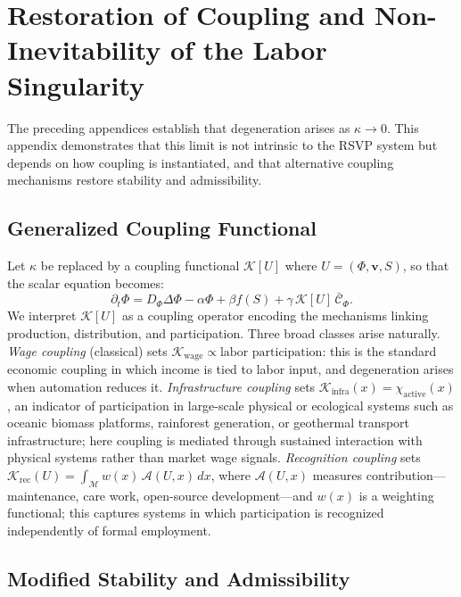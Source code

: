 \documentclass[11pt, a4paper]{article}
\theoremstyle{plain}
\theoremstyle{definition}
\newcommand{\Phifield}{\Phi}
\newcommand{\vfield}{\mathbf{v}}
\newcommand{\Sfield}{S}
\newcommand{\statespace}{\mathcal{M}}
\newcommand{\coupling}{\kappa}
\begin{document}
\section{Restoration of Coupling and Non-Inevitability of the Labor Singularity}

The preceding appendices establish that degeneration arises as $\coupling \to 0$.
This appendix demonstrates that this limit is not intrinsic to the RSVP system
but depends on how coupling is instantiated, and that alternative coupling
mechanisms restore stability and admissibility.

\subsection{Generalized Coupling Functional}

Let $\coupling$ be replaced by a coupling functional $\mathcal{K}[U]$ where
$U = (\Phifield, \vfield, \Sfield)$, so that the scalar equation becomes:
\[
  \partial_t \Phifield
  =
  D_\Phi \Delta \Phifield
  - \alpha \Phifield
  + \beta f(\Sfield)
  + \gamma\, \mathcal{K}[U]\, \bar{\mathcal{C}}_\Phi.
\]
We interpret $\mathcal{K}[U]$ as a coupling operator encoding the mechanisms
linking production, distribution, and participation. Three broad classes arise
naturally. \emph{Wage coupling} (classical) sets $\mathcal{K}_{\mathrm{wage}} \propto \text{labor participation}$: this is the standard economic coupling in which income is tied to labor input, and degeneration arises when automation reduces it. \emph{Infrastructure coupling} sets $\mathcal{K}_{\mathrm{infra}}(x) = \chi_{\mathrm{active}}(x)$, an indicator of participation in large-scale physical or ecological systems such as oceanic biomass platforms, rainforest generation, or geothermal transport infrastructure; here coupling is mediated through sustained interaction with physical systems rather than market wage signals. \emph{Recognition coupling} sets
$\mathcal{K}_{\mathrm{rec}}(U) = \int_{\statespace} w(x)\, \mathcal{A}(U,x)\, dx$,
where $\mathcal{A}(U,x)$ measures contribution---maintenance, care work,
open-source development---and $w(x)$ is a weighting functional; this captures
systems in which participation is recognized independently of formal employment.

\subsection{Modified Stability and Admissibility}
\end{document}
